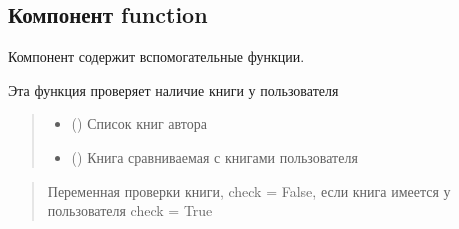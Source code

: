\documentclass[letterpaper,10pt,russian]{sphinxmanual}
\begin{document}
\subsection{Компонент function}
\label{\detokenize{blueprints:function}}
\begin{DUlineblock}{0em}
\item[] Компонент содержит вспомогательные функции.
\end{DUlineblock}
\label{\detokenize{blueprints:module-blueprints.function}}

\begin{fulllineitems}
\label{\detokenize{blueprints:blueprints.function.check_book_on_user}}
\pysigstartsignatures
{}
\pysigstopsignatures
\sphinxAtStartPar
Эта функция проверяет наличие книги у пользователя
\begin{quote}\begin{description}
\begin{itemize}
\item {} 
\sphinxAtStartPar
{} (\sphinxstyleliteralemphasis{\sphinxupquote{{[}}}\sphinxstyleliteralemphasis{\sphinxupquote{{]}}}) \textendash{} Список книг автора

\item {} 
\sphinxAtStartPar
{} () \textendash{} Книга сравниваемая с книгами пользователя

\end{itemize}

\end{description}\end{quote}
\begin{description}
\begin{quote}\begin{description}
\sphinxAtStartPar
Переменная проверки книги, check = False, если книга имеется у пользователя check = True


\end{description}
\end{quote}
\end{description}
\end{fulllineitems}
\end{document}
